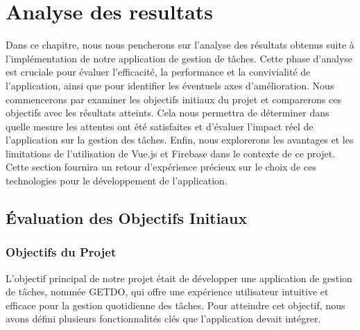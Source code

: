 \documentclass[a4paper,12pt]{report}
\begin{document}
  \chapter{Analyse des resultats}
  Dans ce chapitre, nous nous pencherons sur l'analyse des résultats obtenus suite à l'implémentation de notre application de gestion de tâches. Cette phase d'analyse est cruciale pour évaluer l'efficacité, la performance et la convivialité de l'application, ainsi que pour identifier les éventuels axes d'amélioration.
  Nous commencerons par examiner les objectifs initiaux du projet et comparerons ces objectifs avec les résultats atteints. Cela nous permettra de déterminer dans quelle mesure les attentes ont été satisfaites et d'évaluer l'impact réel de l'application sur la gestion des tâches.
  Enfin, nous explorerons les avantages et les limitations de l'utilisation de Vue.js et Firebase dans le contexte de ce projet. Cette section fournira un retour d'expérience précieux sur le choix de ces technologies pour le développement de l'application.
  
  \section{Évaluation des Objectifs Initiaux}
    \subsection{Objectifs du Projet}
    L'objectif principal de notre projet était de développer une application de gestion de tâches, nommée GETDO, qui offre une expérience utilisateur intuitive et efficace pour la gestion quotidienne des tâches. Pour atteindre cet objectif, nous avons défini plusieurs fonctionnalités clés que l'application devait intégrer.
    
\end{document}
